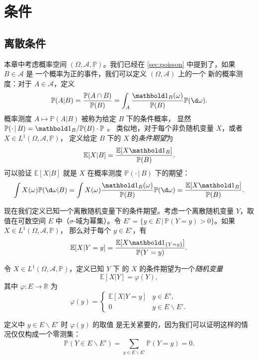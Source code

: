 

\chapter{条件}\label{chap:condition}

\section{离散条件}

本章中考虑概率空间 $(\Omega,\mathcal{A},\mathbb{P})$。我们已经在
\autoref{sec:poisson} 中提到了，如果 $B\in \mathcal{A}$ 是
一个概率为正的事件，我们可以定义 $(\Omega,\mathcal{A})$ 上的一个
新的概率测度：对于 $A\in \mathcal{A}$，定义
\[
  \mathbb{P}(A|B)=\frac{\mathbb{P}(A\cap B)}{\mathbb{P}(B)}
  =\int_A \frac{\idf_B(\omega)}{\mathbb{P}(B)} \mathbb{P}(\d \omega).  
\]
概率测度 $A\mapsto \mathbb{P}(A|B)$ 被称为给定 $B$ 下的条件概率，
显然 $\mathbb{P}(\cdot \,|\, B)=\idf_B/ \mathbb{P}(B) \cdot \mathbb{P}$ 。
类似地，对于每个非负随机变量 $X$，或者 $X\in L^1(\Omega,\mathcal{A},\mathbb{P})$，
定义给定 $B$ 下的 $X$ 的\emph{条件期望}为
\[
  \mathbb{E}[X|B]=\frac{\mathbb{E}[X\indicator{B}]}{\mathbb{P}(B)}.  
\]
可以验证 $\mathbb{E}[X|B]$ 就是 $X$ 在概率测度 $\mathbb{P}(\cdot\,|\, B)$ 下的期望：
\[
  \int X(\omega) \mathbb{P}(\d\omega|B)= 
  \int X(\omega)\frac{\indicator{B}(\omega)}{\mathbb{P}(B)}  \mathbb{P}(\d\omega) 
  =\frac{\mathbb{E}[X\indicator{B}]}{\mathbb{P}(B)}.
\]

现在我们定义已知一个离散随机变量下的条件期望。考虑一个离散随机变量
$Y$，取值在可数空间 $E$ 中（$\sigma$-域为幂集）。令
$E'=\{y\in E\,|\, \mathbb{P}(Y=y)>0\}$。如果 $X\in L^1(\Omega,\mathcal{A},\mathbb{P})$，
那么对于每个 $y\in E'$，有
\[
  \mathbb{E}[X|Y=y]=\frac{\mathbb{E}[X\indicator{\{Y=y\}}]}{\mathbb{P}(Y=y)}.
\]

\begin{definition}
  令 $X\in L^1(\Omega,\mathcal{A},\mathbb{P})$，定义已知 $Y$ 下
  的 $X$ 的条件期望为一个\emph{随机变量}
  \[
    \mathbb{E}[X|Y]=\varphi(Y),  
  \]
  其中 $\varphi:E\to \mathbb{R}$ 为
  \[
    \varphi(y)=\begin{cases}
      \mathbb{E}[X|Y=y] & y\in E',\\
      0 & y\in E\smallsetminus E'.
    \end{cases}
  \] 
\end{definition}
\begin{remark}
  定义中 $y\in E \smallsetminus E'$ 时 $\varphi(y)$ 的取值
  是无关紧要的，因为我们可以证明这样的情况仅仅构成一个零测集：
  \[
    \mathbb{P}(Y\in E \smallsetminus E')=
    \sum_{y\in E \smallsetminus E'}\mathbb{P}(Y=y)
    =0.
  \]
\end{remark}

